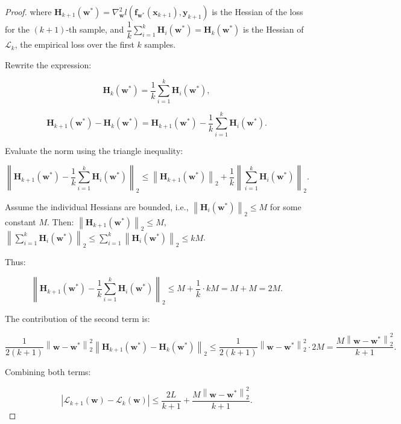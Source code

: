 \documentclass{article}
\begin{document}
\begin{proof}
where \(\mathbf{H}_{k+1}(\mathbf{w}^*) = \nabla^2_{\mathbf{w}} l(\mathbf{f}_{\mathbf{w}^*}(\mathbf{x}_{k+1}), \mathbf{y}_{k+1})\) is the Hessian of the loss for the \((k+1)\)-th sample, and \(\dfrac{1}{k} \sum_{i=1}^{k} \mathbf{H}_i(\mathbf{w}^*) = \mathbf{H}_k(\mathbf{w}^*)\) is the Hessian of \(\mathcal{L}_k\), the empirical loss over the first \(k\) samples.

Rewrite the expression:

\[
\mathbf{H}_k(\mathbf{w}^*) = \dfrac{1}{k} \sum_{i=1}^{k} \mathbf{H}_i(\mathbf{w}^*),
\]

\[
\mathbf{H}_{k+1}(\mathbf{w}^*) - \mathbf{H}_k(\mathbf{w}^*) = \mathbf{H}_{k+1}(\mathbf{w}^*) - \dfrac{1}{k} \sum_{i=1}^{k} \mathbf{H}_i(\mathbf{w}^*).
\]

Evaluate the norm using the triangle inequality:

\[
\left\| \mathbf{H}_{k+1}(\mathbf{w}^*) - \dfrac{1}{k} \sum_{i=1}^{k} \mathbf{H}_i(\mathbf{w}^*) \right\|_2 \leqslant \left\| \mathbf{H}_{k+1}(\mathbf{w}^*) \right\|_2 + \dfrac{1}{k} \left\| \sum_{i=1}^{k} \mathbf{H}_i(\mathbf{w}^*) \right\|_2.
\]

Assume the individual Hessians are bounded, i.e., \(\left\| \mathbf{H}_i(\mathbf{w}^*) \right\|_2 \leqslant M\) for some constant \(M\). Then:
\(\left\| \mathbf{H}_{k+1}(\mathbf{w}^*) \right\|_2 \leqslant M\),
\(\left\| \sum_{i=1}^{k} \mathbf{H}_i(\mathbf{w}^*) \right\|_2 \leqslant \sum_{i=1}^{k} \left\| \mathbf{H}_i(\mathbf{w}^*) \right\|_2 \leqslant k M\).

Thus:

\[
\left\| \mathbf{H}_{k+1}(\mathbf{w}^*) - \dfrac{1}{k} \sum_{i=1}^{k} \mathbf{H}_i(\mathbf{w}^*) \right\|_2 \leqslant M + \dfrac{1}{k} \cdot k M = M + M = 2M.
\]

The contribution of the second term is:

\[
\dfrac{1}{2 (k+1)} \left\| \mathbf{w} - \mathbf{w}^* \right\|_2^2 \left\| \mathbf{H}_{k+1}(\mathbf{w}^*) - \mathbf{H}_k(\mathbf{w}^*) \right\|_2 \leqslant \dfrac{1}{2 (k+1)} \left\| \mathbf{w} - \mathbf{w}^* \right\|_2^2 \cdot 2M = \dfrac{M \left\| \mathbf{w} - \mathbf{w}^* \right\|_2^2}{k+1}.
\]

Combining both terms:

\[
\left| \mathcal{L}_{k+1}(\mathbf{w}) - \mathcal{L}_k(\mathbf{w}) \right| \leqslant \dfrac{2L}{k+1} + \dfrac{M \left\| \mathbf{w} - \mathbf{w}^* \right\|_2^2}{k+1}.
\]

\end{proof}
\end{document}
